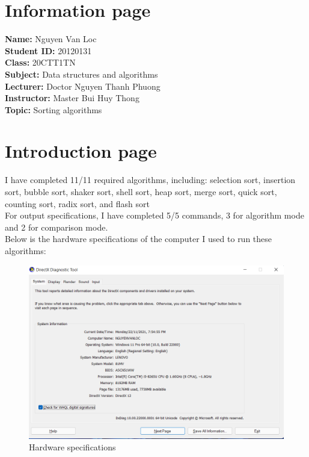 \documentclass[12pt,a4paper]{article}
\begin{document}
\section{Information page}
\textbf{Name:} Nguyen Van Loc\\
\textbf{Student ID:} 20120131\\
\textbf{Class:} 20CTT1TN\\
\textbf{Subject:} Data structures and algorithms\\
\textbf{Lecturer:} Doctor Nguyen Thanh Phuong\\
\textbf{Instructor:} Master Bui Huy Thong\\
\textbf{Topic:} Sorting algorithms

\newpage

\section{Introduction page}
I have completed 11/11 required algorithms, including: selection sort, insertion sort, bubble sort, shaker sort, shell sort, heap sort, merge sort, quick sort, counting sort, radix sort, and flash sort\\
For output specifications, I have completed 5/5 commands, 3 for algorithm mode and 2 for comparison mode.\\
Below is the hardware specifications of the computer I used to run these algorithms:
\begin{figure}[H]
\begin{center}
\includegraphics[scale=0.75]{hardware}
\end{center}
\caption{Hardware specifications}
\end{figure}
\end{document}
